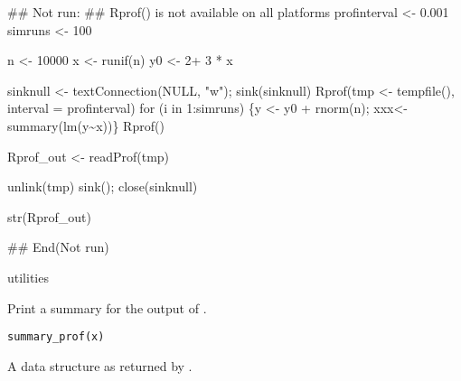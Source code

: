 \documentclass[a4paper]{book}
\begin{document}
\begin{SeeAlso}\relax
{}



## Not run: 
\#\# Rprof() is not available on all platforms
profinterval <- 0.001
simruns <- 100

n <- 10000
x <- runif(n)
y0 <- 2+ 3 * x

sinknull <- textConnection(NULL, "w"); sink(sinknull)
Rprof(tmp <- tempfile(), interval = profinterval)
for (i in 1:simruns) \{y <- y0 +  rnorm(n); xxx<- summary(lm(y\textasciitilde{}x))\}
Rprof()

Rprof\_out <- readProf(tmp)

unlink(tmp)
sink(); close(sinknull)

str(Rprof\_out)

## End(Not run)


utilities
\end{SeeAlso}
%
\begin{Description}\relax
Print a summary for the output of .
\end{Description}
%
\begin{Usage}
\begin{verbatim}
summary_prof(x)
\end{verbatim}
\end{Usage}
%
\begin{Arguments}
\begin{ldescription}
\item[\code{x}] A data structure as returned by  .

\end{ldescription}
\end{Arguments}
\end{document}
